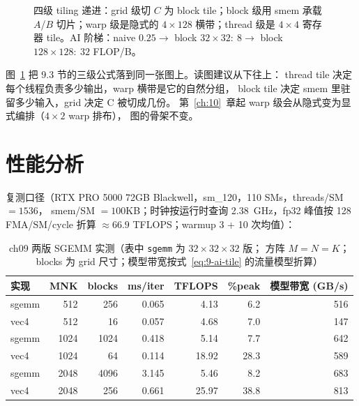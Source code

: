 \begin{figure}[htbp]
\caption{四级 tiling 递进：grid 级切 $C$ 为 block tile；block 级用 smem 承载 $A$/$B$ 切片；warp 级是隐式的 $4\times128$ 横带；thread 级是 $4\times4$ 寄存器 tile。AI 阶梯：naive $0.25 \to$ block $32{\times}32{:}\ 8 \to$ block $128{\times}128{:}\ 32$ FLOP/B。}
\label{fig:9-1}
\end{figure}

图~\ref{fig:9-1} 把 9.3 节的三级公式落到同一张图上。读图建议从下往上：
thread tile 决定每个线程负责多少输出，warp 横带是它的自然分组，
block tile 决定 smem 里驻留多少输入，grid 决定 C 被切成几份。
第~\ref{ch:10}~章起 warp 级会从隐式变为显式编排（$4 \times 2$ warp 排布），
图的骨架不变。

\section{性能分析}

复测口径（RTX PRO 5000 72GB Blackwell，sm\_120，110 SMs，threads/SM $=1536$，
smem/SM $=100$KB；时钟按运行时查询 2.38~GHz，fp32 峰值按 128 FMA/SM/cycle 折算
$\approx 66.9$ TFLOPS；warmup 3 + 10 次均值）：

\begin{table}[htbp]
\centering
\caption{ch09 两版 SGEMM 实测（表中 \texttt{sgemm} 为 $32{\times}32{\times}32$ 版；
方阵 $M{=}N{=}K$；blocks 为 grid 尺寸；模型带宽按式~\ref{eq:9-ai-tile} 的流量模型折算）}
\label{tab:9-bench}
\begin{tabular}{lrrrrrr}
\toprule
实现 & MNK & blocks & ms/iter & TFLOPS & \%peak & 模型带宽 (GB/s) \\
\midrule
sgemm & 512  & 256  & 0.065 & 4.13  & 6.2  & 516 \\
vec4  & 512  & 16   & 0.057 & 4.68  & 7.0  & 147 \\
sgemm & 1024 & 1024 & 0.418 & 5.14  & 7.7  & 642 \\
vec4  & 1024 & 64   & 0.114 & 18.92 & 28.3 & 589 \\
sgemm & 2048 & 4096 & 3.145 & 5.46  & 8.2  & 683 \\
vec4  & 2048 & 256  & 0.661 & 25.97 & 38.8 & 813 \\
\bottomrule
\end{tabular}
\end{table}


